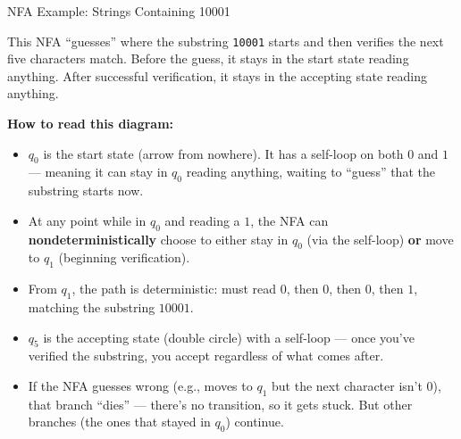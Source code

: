 \begin{examplebox}{{NFA Example: Strings Containing 10001}}

This NFA ``guesses'' where the substring \texttt{10001} starts and then
verifies the next five characters match. Before the guess, it stays in the
start state reading anything. After successful verification, it stays in the
accepting state reading anything.

\begin{center}
\end{center}

\textbf{How to read this diagram:}
\begin{itemize}[nosep]
\item $q_0$ is the start state (arrow from nowhere). It has a self-loop on both
  $0$ and $1$ --- meaning it can stay in $q_0$ reading anything, waiting to
  ``guess'' that the substring starts now.
\item At any point while in $q_0$ and reading a $1$, the NFA can
  \textbf{nondeterministically} choose to either stay in $q_0$ (via the
  self-loop) \textbf{or} move to $q_1$ (beginning verification).
\item From $q_1$, the path is deterministic: must read $0$, then $0$, then $0$,
  then $1$, matching the substring $10001$.
\item $q_5$ is the accepting state (double circle) with a self-loop --- once
  you've verified the substring, you accept regardless of what comes after.
\item If the NFA guesses wrong (e.g., moves to $q_1$ but the next character
  isn't $0$), that branch ``dies'' --- there's no transition, so it gets stuck.
  But other branches (the ones that stayed in $q_0$) continue.
\end{itemize}

\end{examplebox}

